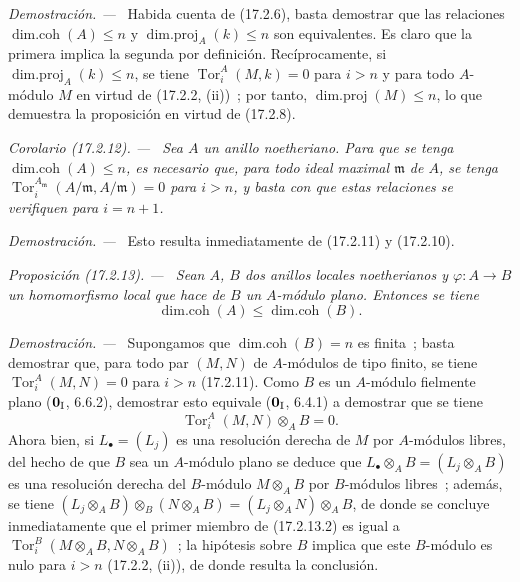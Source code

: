 \documentclass[10pt,oneside]{book}
\makeatletter
\newcommand{\setmanualcurrentlabel}[1]{\def\@currentlabel{#1}}
\newcommand{\oldpage}[2][]{%
  \setcounter{footnote}{0}%
  \marginpar{\scriptsize\textbf{#1}~|~#2}\ignorespaces}
\newenvironment{proposition}[1][]{%
  \setmanualcurrentlabel{#1}\par\medskip\noindent\itshape Proposición (#1). ---\ }{\par}
\newenvironment{corollary}[1][]{%
  \setmanualcurrentlabel{#1}\par\medskip\noindent\itshape Corolario (#1). ---\ }{\par}
\newenvironment{proof}{%
  \par\medskip\noindent\textit{Demostración. ---\ }}{\par}
\makeatother
\begin{document}
\begin{proof}
Habida cuenta de (17.2.6), basta demostrar que las relaciones
$\operatorname{dim.coh}(A)\leq n$ y
$\operatorname{dim.proj}_A(k)\leq n$ son equivalentes. Es claro que la
primera implica la segunda por definición. Recíprocamente, si
$\operatorname{dim.proj}_A(k)\leq n$, se tiene
$\operatorname{Tor}^A_i(M,k)=0$ para $i>n$ y para todo $A$-módulo $M$ en
virtud de (17.2.2, (ii))~; por tanto, $\operatorname{dim.proj}(M)\leq n$, lo que
demuestra la proposición en virtud de (17.2.8).
\end{proof}

\begin{corollary}[17.2.12]
\label{0.17.2.12-es}
Sea $A$ un anillo noetheriano. Para que se tenga
$\operatorname{dim.coh}(A)\leq n$, es necesario que, para todo ideal
maximal $\mathfrak{m}$ de $A$, se tenga
$\operatorname{Tor}^{A_{\mathfrak{m}}}_i(A/\mathfrak{m},A/\mathfrak{m})=0$
para $i>n$, y basta con que estas relaciones se verifiquen para $i=n+1$.
\end{corollary}

\begin{proof}
Esto resulta inmediatamente de (17.2.11) y (17.2.10).
\end{proof}

\begin{proposition}[17.2.13]
\label{0.17.2.13-es}
Sean $A$, $B$ dos anillos locales noetherianos y
$\varphi:A\longrightarrow B$ un homomorfismo local que hace de $B$ un
$A$-módulo plano. Entonces se tiene
\begin{equation}
\label{0.17.2.13.1-es}
\tag{17.2.13.1}
  \operatorname{dim.coh}(A)\leq\operatorname{dim.coh}(B).
\end{equation}
\end{proposition}

\begin{proof}
Supongamos que $\operatorname{dim.coh}(B)=n$ es finita~; basta demostrar
que, para todo par $(M,N)$ de $A$-módulos de tipo finito, se tiene
$\operatorname{Tor}^A_i(M,N)=0$ para $i>n$ (17.2.11). Como $B$ es un
$A$-módulo fielmente plano ($\mathbf 0_{\rm I}$, 6.6.2), demostrar esto equivale
($\mathbf{0}_{\rm I}$, 6.4.1) a demostrar que se tiene
\begin{equation}
\label{0.17.2.13.2-es}
\tag{17.2.13.2}
  \operatorname{Tor}^A_i(M,N)\otimes_A B=0.
\end{equation}
Ahora bien, si $L_\bullet=(L_j)$ es una resolución derecha de $M$ por $A$-módulos
libres, del hecho de que $B$ sea un $A$-módulo plano se deduce que
$L_\bullet\otimes_A B=(L_j\otimes_A B)$ es una resolución derecha del
$B$-módulo $M\otimes_A B$ por $B$-módulos libres~; además, se tiene
$(L_j\otimes_A B)\otimes_B(N\otimes_A B)
=(L_j\otimes_A N)\otimes_A B$, de donde se concluye inmediatamente que el primer miembro
\oldpage[0\textsubscript{IV-1}]{46}
de (17.2.13.2) es igual a
$\operatorname{Tor}^B_i(M\otimes_A B,N\otimes_A B)$~; la hipótesis sobre $B$
implica que este $B$-módulo es nulo para $i>n$ (17.2.2, (ii)), de donde resulta la
conclusión.
\end{proof}
\end{document}
